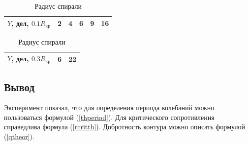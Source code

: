 \documentclass{article}
\begin{document}
   \begin{table}[h]
   \centering 
   \caption{Радиус спирали}
   \begin{tabular}{|*{6}{c|}}
   \hline 
   $Y$, дел, $0.1R_\text{кр}$ & 2 & 4 & 6 & 9 & 16 \\ \hline  
   \end{tabular} 
   \begin{tabular}{|*{3}{c|}}
   \hline 
   $Y$, дел, $0.3R_\text{кр}$ & 6 & 22 \\ \hline  
   \end{tabular} 
   \end{table} 
   
   
   \subsection*{Вывод}
   Эксперимент показал, что для определения периода колебаний можно пользоваться формулой (\ref{thperiod}). Для критического сопротивления справедлива формула (\ref{rcritth}). Добротность контура можно описать формулой (\ref{qtheor}).
\end{document}
